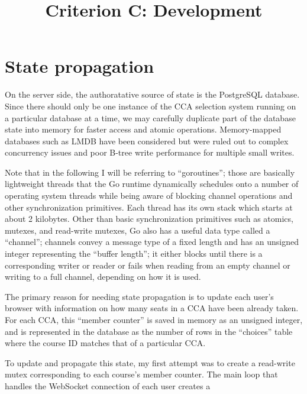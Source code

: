 

\title{Criterion C: Development}


\maketitle


\section{State propagation}

On the server side, the authoratative source of state is the
PostgreSQL database. Since there should only be one instance of the
CCA selection system running on a particular database at a time, we
may carefully duplicate part of the database state into memory for
faster access and atomic operations. Memory-mapped databases such
as LMDB have been considered but were ruled out to complex
concurrency issues and poor B-tree write performance for multiple
small writes.

Note that in the following I will be referring to ``goroutines'';
those are basically lightweight threads that the Go runtime
dynamically schedules onto a number of operating system threads while
being aware of blocking channel operations and other synchronization
primitives. Each thread has its own stack which starts at about 2
kilobytes. Other than basic synchronization primitives such as
atomics, mutexes, and read-write mutexes, Go also has a useful data
type called a ``channel''; channels convey a message type of a fixed
length and has an unsigned integer representing the ``buffer length'';
it either blocks until there is a corresponding writer or reader or
fails when reading from an empty channel or writing to a full channel,
depending on how it is used.

The primary reason for needing state propagation is to update each
user's browser with information on how many seats in a CCA have been
already taken. For each CCA, this ``member counter'' is saved in
memory as an unsigned integer, and is represented in the database as
the number of rows in the ``choices'' table where the course ID
matches that of a particular CCA.

To update and propagate this state, my first attempt was to create
a read-write mutex corresponding to each course's member counter.
The main loop that handles the WebSocket connection of each user
creates a 

